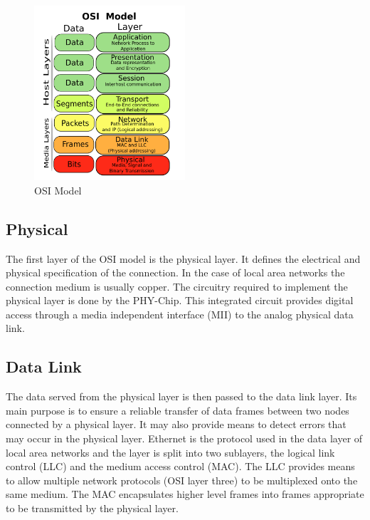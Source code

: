 \begin{figure}[tb!]
    \centering
    \includegraphics[width=0.5\textwidth]{images/theory/osi.png}
    \caption{OSI Model \cite{osi}}
    \label{fig:osi}
\end{figure}


\subsection{Physical} \label{chapt:theory:physical}
The first layer of the OSI model is the physical layer. It defines the electrical and physical specification of the connection. In the case of local
area networks the connection medium is usually copper. The circuitry required to implement the physical layer is done by the PHY-Chip. This integrated circuit provides digital access through a media independent interface (MII) to the analog physical data link.


\subsection{Data Link} 
The data served from the physical layer is then passed to the data link layer.
Its main purpose is to ensure a reliable transfer of data frames between two
nodes connected by a physical layer. It may also provide means to detect errors
that may occur in the physical layer. Ethernet is the protocol used in the data
layer of local area networks and the layer is split into two sublayers, the logical link control (LLC) and the medium access control (MAC). The LLC provides means to allow multiple network protocols (OSI layer three) to be multiplexed onto the same medium. The MAC encapsulates higher level frames into frames appropriate to be transmitted by the physical layer.
\\

